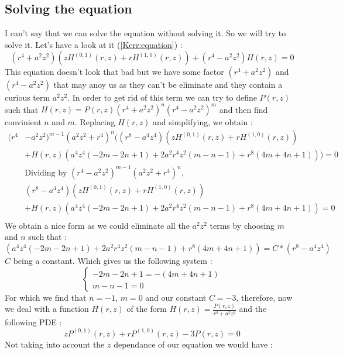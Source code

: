 \documentclass[a4paper,12pt]{article}
\theoremstyle{definition}
\begin{document}
\subsection{Solving the equation}
I can't say that we can solve the equation without solving it.
So we will try to solve it.
Let's have a look at it (\ref{Kerr:equation}) :
\begin{equation*}
	(r^4+a^2z^2)(z H^{(0,1)}(r,z)+rH^{(1,0)}(r,z))+(r^4-a^2 z^2) H(r,z)=0
\end{equation*}
This equation doesn't look that bad but we have some factor $(r^4+a^2z^2)$ and $(r^4-a^2 z^2)$ that may anoy us as they can't be eliminate and they contain a curious term $a^2z^2$.
In order to get rid of this term we can try to define $P(r,z)$ such that $H(r,z)=P(r,z)(r^4+a^2z^2)^n(r^4-a^2 z^2)^m$ and then find convinient $n$ and $m$.
Replacing $H(r,z)$ and simplifying, we obtain :
\begin{align*}
   (r^4&-a^2 z^2)^{m-1} (a^2z^2+r^4)^n((r^8-a^4 z^4)(z H^{(0,1)}(r,z)+r H^{(1,0)}(r,z))\\
   &+H(r,z)(a^4 z^4 (-2 m-2 n+1)+2 a^2 r^4 z^2 (m-n-1)+r^8(4 m+4 n+1)))=0\\
   &\text{Dividing by }(r^4-a^2 z^2)^{m-1} (a^2z^2+r^4)^n,\\
   &(r^8-a^4 z^4)(z H^{(0,1)}(r,z)+r H^{(1,0)}(r,z))\\
   &+H(r,z)(a^4 z^4 (-2 m-2 n+1)+2 a^2 r^4 z^2 (m-n-1)+r^8(4 m+4 n+1))=0\\
\end{align*}
We obtain a nice form as we could eliminate all the $a^2z^2$ terms by choosing $m$ and $n$ such that :
\begin{equation*}
	(a^4 z^4 (-2 m-2 n+1)+2 a^2 r^4 z^2 (m-n-1)+r^8(4 m+4 n+1))=C*(r^8-a^4 z^4)
\end{equation*}
$C$ being a constant. Which gives us the following system :
\begin{equation*}
\begin{cases} -2 m-2 n+1=- (4 m+4 n+1)\\ m-n-1=0 \end{cases}
\end{equation*}
For which we find that $n=-1$, $m=0$ and our constant $C=-3$, therefore, now we deal with a function $H(r,z)$ of the form $H(r,z)=\frac{P(r,z)}{r^4+a^2z^2}$ and the following PDE :
\begin{equation}\label{P:Eq}
	z P^{(0,1)}(r,z)+r P^{(1,0)}(r,z)-3P(r,z)=0
\end{equation}
Not taking into account the $z$ dependance of our equation we would have :
\end{document}
